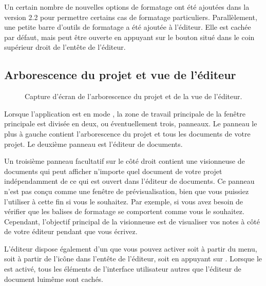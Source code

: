 \documentclass[a4paper,11pt,french]{sphinxmanual}
\begin{document}
\sphinxAtStartPar
{}Un certain nombre de nouvelles options de formatage ont été ajoutées dans la version 2.2 pour permettre certains cas de formatage particuliers. Parallèlement, une petite barre d’outils de formatage a été ajoutée à l’éditeur. Elle est cachée par défaut, mais peut être ouverte en appuyant sur le bouton situé dans le coin supérieur droit de l’en\sphinxhyphen{}tête de l’éditeur.


\subsection{Arborescence du projet et vue de l’éditeur}
\label{\detokenize{usage_breakdown:project-tree-and-editor-view}}
\begin{figure}[htbp]
\centering
\capstart

\noindent{}
\caption{Capture d’écran de l’arborescence du projet et de la vue de l’éditeur.}\label{\detokenize{usage_breakdown:id1}}\end{figure}

\sphinxAtStartPar
Lorsque l’application est en mode , la zone de travail principale de la fenêtre principale est divisée en deux, ou éventuellement trois, panneaux. Le panneau le plus à gauche contient l’arborescence du projet et tous les documents de votre projet. Le deuxième panneau est l’éditeur de documents.

\sphinxAtStartPar
Un troisième panneau facultatif sur le côté droit contient une visionneuse de documents qui peut afficher n’importe quel document de votre projet indépendamment de ce qui est ouvert dans l’éditeur de documents. Ce panneau n’est pas conçu comme une fenêtre de prévisualisation, bien que vous puissiez l’utiliser à cette fin si vous le souhaitez. Par exemple, si vous avez besoin de vérifier que les balises de formatage se comportent comme vous le souhaitez. Cependant, l’objectif principal de la visionneuse est de visualiser vos notes à côté de votre éditeur pendant que vous écrivez.

\sphinxAtStartPar
L’éditeur dispose également d’un  que vous pouvez activer soit à partir du menu, soit à partir de l’icône dans l’en\sphinxhyphen{}tête de l’éditeur, soit en appuyant sur . Lorsque le  est activé, tous les éléments de l’interface utilisateur autres que l’éditeur de document lui\sphinxhyphen{}même sont cachés.
\end{document}
